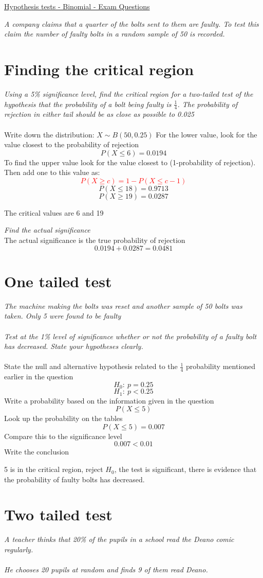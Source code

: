 \documentclass{article}[18pt]
\begin{document}
\begin{center}
\underline{\huge Hypothesis tests - Binomial - Exam Questions}
\end{center}
\textit{A company claims that a quarter of the bolts sent to them are faulty. To test this claim the
number of faulty bolts in a random sample of 50 is recorded.}
\section{Finding the critical region}
\textit{Using a 5\% significance level, find the critical region for a two-tailed test of the
hypothesis that the probability of a bolt being faulty is $\frac{1}{4}$. The probability of rejection in
either tail should be as close as possible to 0.025}\\
\\
Write down the distribution:
$X\sim B(50,0.25)$
For the lower value, look for the value closest to the probability of rejection
$$P(X\leqslant6)=0.0194$$
To find the upper value look for the value closest to (1-probability of rejection). Then add one to this value as:
\textcolor{red}{$$P(X\geqslant c)=1-P(X\leqslant c-1)$$}
$$P(X\leqslant18)=0.9713$$
$$P(X\geqslant19)=0.0287$$
\begin{center}
The critical values are 6 and 19
\end{center}
\textit{Find the actual significance}\\
The actual significance is the true probability of rejection
$$0.0194+0.0287=0.0481$$
\section{One tailed test}
\textit{The machine making the bolts was reset and another sample of 50 bolts was taken. Only 5 were
found to be faulty}\\
\\
\textit{Test at the 1\% level of significance whether or not the probability of a faulty bolt has
decreased. State your hypotheses clearly.}\\
\\
State the null and alternative hypothesis related to the $\frac{1}{4}$ probability mentioned earlier in the question
$$H_0: \ p=0.25$$
$$H_1: \ p<0.25$$
Write a probability based on the information given in the question
$$P(X\leqslant5)$$
Look up the probability on the tables
$$P(X\leqslant5)=0.007$$
Compare this to the significance level
$$0.007<0.01$$
Write the conclusion
\begin{center}
5 is in the critical region, reject $H_0$, the test is significant, there is evidence that the probability of faulty bolts has decreased.
\end{center}
\newpage
\section{Two tailed test}
\textit{A teacher thinks that 20\% of the pupils in a school read the Deano comic regularly.\\
\\
He chooses 20 pupils at random and finds 9 of them read Deano.}
\end{document}
